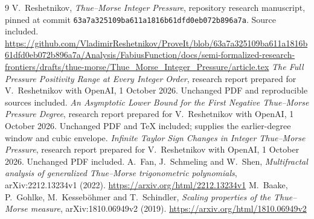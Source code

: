 \documentclass[11pt,a4paper]{article}
\theoremstyle{remark}\newtheorem*{ednote}{Editorial note (ProveIt, 2026-10-01)}
\begin{document}
\begin{thebibliography}{9}
 V.~Reshetnikov, \emph{Thue--Morse Integer Pressure}, repository research manuscript, pinned at commit \texttt{63a7a325109ba611a1816b61dfd0eb072b896a7a}. Source included.\newline
\url{https://github.com/VladimirReshetnikov/ProveIt/blob/63a7a325109ba611a1816b61dfd0eb072b896a7a/Analysis/FabiusFunction/docs/semi-formalized-research-frontiers/drafts/thue-morse/Thue_Morse_Integer_Pressure/article.tex}
 \emph{The Full Pressure Positivity Range at Every Integer Order}, research report prepared for V.~Reshetnikov with OpenAI, 1 October 2026. Unchanged PDF and reproducible sources included.
 \emph{An Asymptotic Lower Bound for the First Negative Thue--Morse Pressure Degree}, research report prepared for V.~Reshetnikov with OpenAI, 1 October 2026. Unchanged PDF and TeX included; supplies the earlier-degree window and cubic envelope.
 \emph{Infinite Taylor Sign Changes in Integer Thue--Morse Pressure}, research report prepared for V.~Reshetnikov with OpenAI, 1 October 2026. Unchanged PDF included.
 A.~Fan, J.~Schmeling and W.~Shen, \emph{Multifractal analysis of generalized Thue--Morse trigonometric polynomials}, arXiv:2212.13234v1 (2022). \url{https://arxiv.org/html/2212.13234v1}
 M.~Baake, P.~Gohlke, M.~Kesseb\"ohmer and T.~Schindler, \emph{Scaling properties of the Thue--Morse measure}, arXiv:1810.06949v2 (2019). \url{https://arxiv.org/html/1810.06949v2}
\end{thebibliography}
\end{document}
